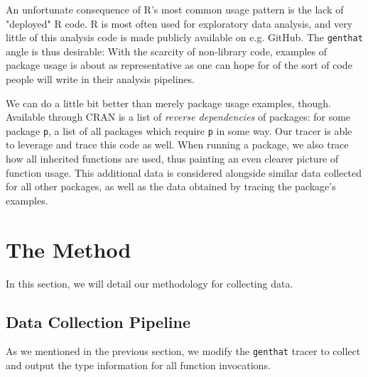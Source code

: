 \documentclass[acmsmall,10pt,review,anonymous]{acmart}\settopmatter{printfolios=true,printccs=false,printacmref=false}
\begin{document}
An unfortunate consequence of R's most common usage pattern is the lack of
"deployed" R code.  R is most often used for exploratory data analysis, and
very little of this analysis code is made publicly available on e.g. GitHub.
The {\tt genthat} angle is thus desirable: With the scarcity of non-library
code, examples of package usage is about as representative as one can hope
for of the sort of code people will write in their analysis pipelines.

We can do a little bit better than merely package usage examples, though.
Available through CRAN is a list of {\it reverse dependencies} of packages:
for some package {\tt p}, a list of all packages which require {\tt p} in
some way.  Our tracer is able to leverage and trace this code as well.  When
running a package, we also trace how all inherited functions are used, thus
painting an even clearer picture of function usage.  This additional data is
considered alongside similar data collected for all other packages, as well
as the data obtained by tracing the package's examples.



\section{The Method}

In this section, we will detail our methodology for collecting data.

%
\subsection{Data Collection Pipeline}

As we mentioned in the previous section, we modify the {\tt genthat} tracer
to collect and output the type information for all function invocations.
\end{document}
